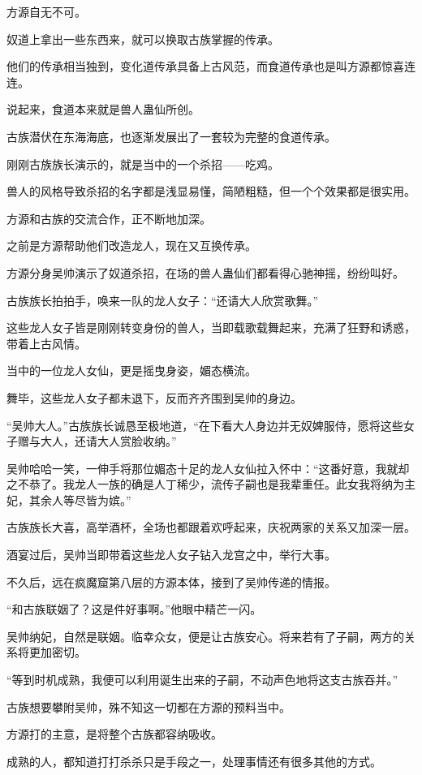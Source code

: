 \begin{this_body}
方源自无不可。

奴道上拿出一些东西来，就可以换取古族掌握的传承。

他们的传承相当独到，变化道传承具备上古风范，而食道传承也是叫方源都惊喜连连。

说起来，食道本来就是兽人蛊仙所创。

古族潜伏在东海海底，也逐渐发展出了一套较为完整的食道传承。

刚刚古族族长演示的，就是当中的一个杀招——吃鸡。

兽人的风格导致杀招的名字都是浅显易懂，简陋粗糙，但一个个效果都是很实用。

方源和古族的交流合作，正不断地加深。

之前是方源帮助他们改造龙人，现在又互换传承。

方源分身吴帅演示了奴道杀招，在场的兽人蛊仙们都看得心驰神摇，纷纷叫好。

古族族长拍拍手，唤来一队的龙人女子：“还请大人欣赏歌舞。”

这些龙人女子皆是刚刚转变身份的兽人，当即载歌载舞起来，充满了狂野和诱惑，带着上古风情。

当中的一位龙人女仙，更是摇曳身姿，媚态横流。

舞毕，这些龙人女子都未退下，反而齐齐围到吴帅的身边。

“吴帅大人。”古族族长诚恳至极地道，“在下看大人身边并无奴婢服侍，愿将这些女子赠与大人，还请大人赏脸收纳。”

吴帅哈哈一笑，一伸手将那位媚态十足的龙人女仙拉入怀中：“这番好意，我就却之不恭了。我龙人一族的确是人丁稀少，流传子嗣也是我辈重任。此女我将纳为主妃，其余人等尽皆为嫔。”

古族族长大喜，高举酒杯，全场也都跟着欢呼起来，庆祝两家的关系又加深一层。

酒宴过后，吴帅当即带着这些龙人女子钻入龙宫之中，举行大事。

不久后，远在疯魔窟第八层的方源本体，接到了吴帅传递的情报。

“和古族联姻了？这是件好事啊。”他眼中精芒一闪。

吴帅纳妃，自然是联姻。临幸众女，便是让古族安心。将来若有了子嗣，两方的关系将更加密切。

“等到时机成熟，我便可以利用诞生出来的子嗣，不动声色地将这支古族吞并。”

古族想要攀附吴帅，殊不知这一切都在方源的预料当中。

方源打的主意，是将整个古族都容纳吸收。

成熟的人，都知道打打杀杀只是手段之一，处理事情还有很多其他的方式。


\end{this_body}
